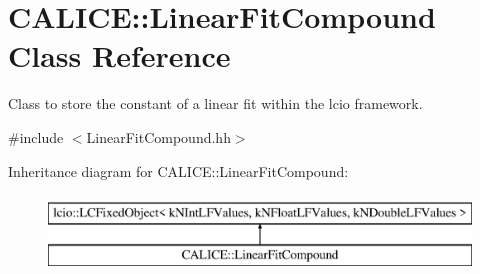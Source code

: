 \section{C\-A\-L\-I\-C\-E\-:\-:Linear\-Fit\-Compound Class Reference}
\label{classCALICE_1_1LinearFitCompound}


Class to store the constant of a linear fit within the lcio framework.  




{\ttfamily \#include $<$Linear\-Fit\-Compound.\-hh$>$}

Inheritance diagram for C\-A\-L\-I\-C\-E\-:\-:Linear\-Fit\-Compound\-:\begin{figure}[H]
\begin{center}
\leavevmode
\includegraphics[height=2.000000cm]{classCALICE_1_1LinearFitCompound}
\end{center}
\end{figure}
